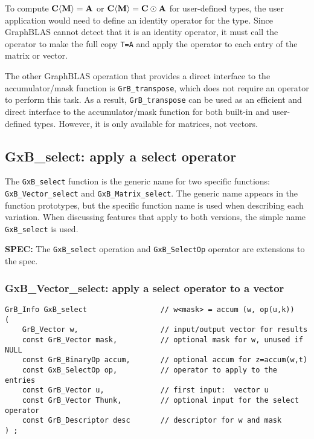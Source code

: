 \documentclass[12pt]{article}
\begin{document}
To compute ${\bf C \langle M \rangle = A}$ or ${\bf C \langle M \rangle = C
\odot A}$ for user-defined types, the user application would need to define an
identity operator for the type.  Since GraphBLAS cannot detect that it is an
identity operator, it must call the operator to make the full copy \verb'T=A'
and apply the operator to each entry of the matrix or vector.

The other GraphBLAS operation that provides a direct interface to the
accumulator/mask function is \verb'GrB_transpose', which does not require an
operator to perform this task.  As a result, \verb'GrB_transpose' can be used
as an efficient and direct interface to the accumulator/mask function for
both built-in and user-defined types.  However, it is only available for
matrices, not vectors.

\newpage
\subsection{{\sf GxB\_select:} apply a select operator} %
\label{select}

The \verb'GxB_select' function is the generic name for two specific functions:
\\ \verb'GxB_Vector_select' and  \verb'GxB_Matrix_select'.  The generic name
appears in the function prototypes, but the specific function name is used when
describing each variation.  When discussing features that apply to both
versions, the simple name \verb'GxB_select' is used.

\begin{spec}
{\bf SPEC:} The \verb'GxB_select' operation and \verb'GxB_SelectOp' operator
are extensions to the spec.
\end{spec}

\subsubsection{{\sf GxB\_Vector\_select:} apply a select operator to a vector}
\label{select_vector}

\begin{mdframed}[userdefinedwidth=6in]
{\footnotesize
\begin{verbatim}
GrB_Info GxB_select                 // w<mask> = accum (w, op(u,k))
(
    GrB_Vector w,                   // input/output vector for results
    const GrB_Vector mask,          // optional mask for w, unused if NULL
    const GrB_BinaryOp accum,       // optional accum for z=accum(w,t)
    const GxB_SelectOp op,          // operator to apply to the entries
    const GrB_Vector u,             // first input:  vector u
    const GrB_Vector Thunk,         // optional input for the select operator
    const GrB_Descriptor desc       // descriptor for w and mask
) ;
\end{verbatim} } \end{mdframed}
\end{document}
